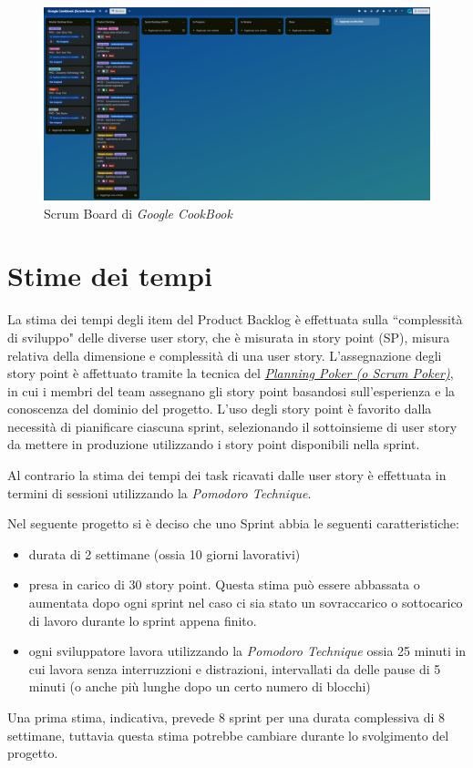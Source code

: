 \documentclass{article}
\begin{document}
\begin{figure}[h]
    \includegraphics[width=\textwidth]{./imgs/scrum-board.png}
    \caption{Scrum Board di \textit{Google CookBook}}
\end{figure}

\newpage
\section{Stime dei tempi}

La stima dei tempi degli item del Product Backlog è effettuata sulla ``complessità di sviluppo" delle diverse user story, 
che è misurata in story point (SP), misura relativa della dimensione e complessità di una user story.
L'assegnazione degli story point è affettuato tramite la tecnica del 
\href{https://en.wikipedia.org/wiki/Planning_poker}{\textit{Planning Poker (o Scrum Poker)}}, 
in cui i membri del team assegnano gli story point basandosi sull'esperienza e la conoscenza del 
dominio del progetto.
L'uso degli story point è favorito dalla necessità di pianificare ciascuna sprint, selezionando 
il sottoinsieme di user story da mettere in produzione utilizzando i story point disponibili 
nella sprint.

Al contrario la stima dei tempi dei task ricavati dalle user story è effettuata in termini di sessioni utilizzando 
la \textit{Pomodoro Technique}.


Nel seguente progetto si è deciso che uno Sprint abbia le seguenti caratteristiche:
\begin{itemize}
    \item durata di 2 settimane (ossia 10 giorni lavorativi)
    \item presa in carico di 30 story point. Questa stima può essere abbassata o aumentata dopo 
    ogni sprint nel caso ci sia stato un sovraccarico o sottocarico di lavoro durante lo sprint 
    appena finito.
    \item ogni sviluppatore lavora utilizzando la \textit{Pomodoro Technique} ossia 25 minuti in cui 
    lavora senza interruzzioni e distrazioni, intervallati da delle pause di 5 minuti (o anche più lunghe
    dopo un certo numero di blocchi)
\end{itemize}

Una prima stima, indicativa, prevede 8 sprint per una durata complessiva di 8 settimane, tuttavia 
questa stima potrebbe cambiare durante lo svolgimento del progetto.
\end{document}
